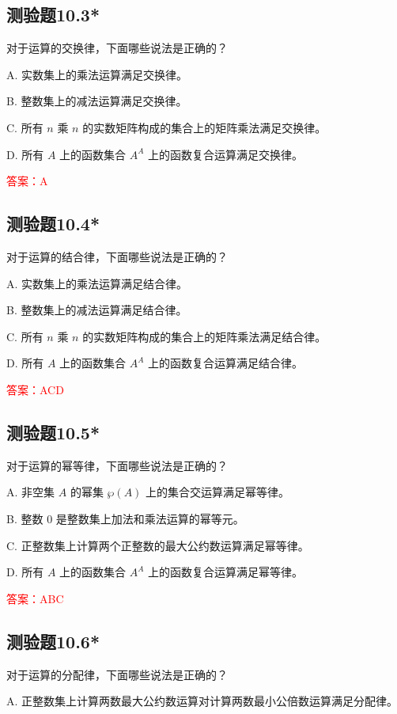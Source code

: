 \documentclass[UTF8, heading=true]{ctexart}
\begin{document}
\subsection{测验题10.3*}

对于运算的交换律，下面哪些说法是正确的？

A. 实数集上的乘法运算满足交换律。

B. 整数集上的减法运算满足交换律。

C. 所有 $n$ 乘 $n$ 的实数矩阵构成的集合上的矩阵乘法满足交换律。

D. 所有 $A$ 上的函数集合 $A^A$ 上的函数复合运算满足交换律。

\textcolor{red}{答案：A}

\subsection{测验题10.4*}

对于运算的结合律，下面哪些说法是正确的？

A. 实数集上的乘法运算满足结合律。

B. 整数集上的减法运算满足结合律。

C. 所有 $n$ 乘 $n$ 的实数矩阵构成的集合上的矩阵乘法满足结合律。

D. 所有 $A$ 上的函数集合 $A^A$ 上的函数复合运算满足结合律。

\textcolor{red}{答案：ACD}

\subsection{测验题10.5*}

对于运算的幂等律，下面哪些说法是正确的？

A. 非空集 $A$ 的幂集 $\wp(A)$ 上的集合交运算满足幂等律。

B. 整数 0 是整数集上加法和乘法运算的幂等元。

C. 正整数集上计算两个正整数的最大公约数运算满足幂等律。

D. 所有 $A$ 上的函数集合 $A^A$ 上的函数复合运算满足幂等律。

\textcolor{red}{答案：ABC}

\subsection{测验题10.6*}

对于运算的分配律，下面哪些说法是正确的？

A. 正整数集上计算两数最大公约数运算对计算两数最小公倍数运算满足分配律。
\end{document}
